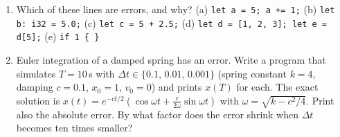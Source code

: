 \begin{enumerate}[label=\textbf{\thechapter.\arabic*}]
  \item Which of these lines are errors, and why? (a) \verb!let a = 5; a += 1;! (b) \verb!let b: i32 = 5.0;! (c) \verb!let c = 5 + 2.5;! (d) \verb!let d = [1, 2, 3]; let e = d[5];! (e) \verb!if 1 { }!
  \item[\textbf{\thechapter.10}$\star$] Euler integration of a damped spring has an error. Write a program that simulates $T=10$\,s with $\Delta t\in\{0.1,\,0.01,\,0.001\}$ (spring constant $k=4$, damping $c=0.1$, $x_0=1$, $v_0=0$) and prints $x(T)$ for each. The exact solution is $x(t)=e^{-ct/2}\left(\cos\omega t+\frac{c}{2\omega}\sin\omega t\right)$ with $\omega=\sqrt{k-c^2/4}$. Print also the absolute error. By what factor does the error shrink when $\Delta t$ becomes ten times smaller?
\end{enumerate}
